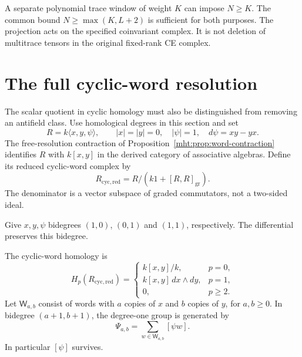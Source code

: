 A separate polynomial
trace window of weight $K$ can impose $N\geq K$. The common
bound $N\geq\max(K,L+2)$ is sufficient for both purposes.
The projection acts on the specified coinvariant complex.
It is not deletion of multitrace tensors in the original
fixed-rank CE complex.

\section{The full cyclic-word resolution}

The scalar quotient in cyclic homology must also be
distinguished from removing an antifield class. Use
homological degrees in this section and set
\[
 R=k\langle x,y,\psi\rangle,\qquad
 |x|=|y|=0,\quad |\psi|=1,\quad
 d\psi=xy-yx.
\]
The free-resolution contraction of
Proposition~\ref{mht:prop:word-contraction} identifies $R$ with
$k[x,y]$ in the derived category of associative algebras.
Define its reduced cyclic-word complex by
\[
 R_{\mathrm{cyc,red}}=R/(k1+[R,R]_{\mathrm{gr}}).
\]
The denominator is a vector subspace of graded commutators,
not a two-sided ideal. 

Give $x,y,\psi$ bidegrees $(1,0)$,
$(0,1)$ and $(1,1)$, respectively. The differential preserves
this bidegree.

\begin{theorem}\label{mht:thm:full-cyclic-word-homology}
The cyclic-word homology is
\[
 H_p(R_{\mathrm{cyc,red}})=
 \begin{cases}
 k[x,y]/k,&p=0,\\
 k[x,y]\,dx\wedge dy,&p=1,\\
 0,&p\geq2.
 \end{cases}
\]
Let $\mathsf W_{a,b}$ consist of words with $a$ copies of $x$
and $b$ copies of $y$, for $a,b\geq0$.
In bidegree $(a+1,b+1)$, the degree-one group is generated by
\[
 \Psi_{a,b}=\sum_{w\in\mathsf W_{a,b}}[\psi w].
\]
In particular $[\psi]$ survives.
\end{theorem}

